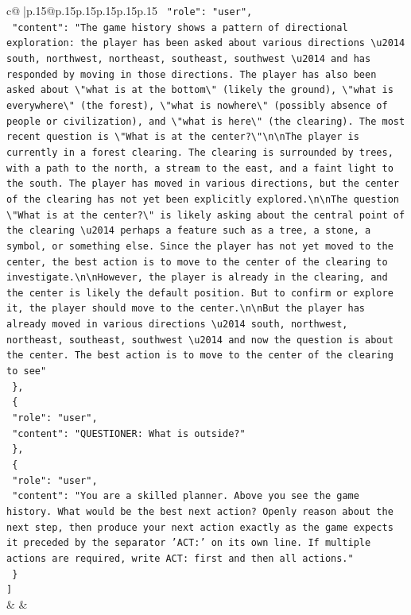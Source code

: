 \documentclass{article}
\begin{document}
{\begin{supertabular}{c@{$\;$}|p{.15\linewidth}@{}p{.15\linewidth}p{.15\linewidth}p{.15\linewidth}p{.15\linewidth}p{.15\linewidth}}
{{{\texttt{    "role": "user",} \\
\texttt{    "content": "The game history shows a pattern of directional exploration: the player has been asked about various directions \textbackslash{}u2014 south, northwest, northeast, southeast, southwest \textbackslash{}u2014 and has responded by moving in those directions. The player has also been asked about \textbackslash{}"what is at the bottom\textbackslash{}" (likely the ground), \textbackslash{}"what is everywhere\textbackslash{}" (the forest), \textbackslash{}"what is nowhere\textbackslash{}" (possibly absence of people or civilization), and \textbackslash{}"what is here\textbackslash{}" (the clearing). The most recent question is \textbackslash{}"What is at the center?\textbackslash{}"\textbackslash{}n\textbackslash{}nThe player is currently in a forest clearing. The clearing is surrounded by trees, with a path to the north, a stream to the east, and a faint light to the south. The player has moved in various directions, but the center of the clearing has not yet been explicitly explored.\textbackslash{}n\textbackslash{}nThe question \textbackslash{}"What is at the center?\textbackslash{}" is likely asking about the central point of the clearing \textbackslash{}u2014 perhaps a feature such as a tree, a stone, a symbol, or something else. Since the player has not yet moved to the center, the best action is to move to the center of the clearing to investigate.\textbackslash{}n\textbackslash{}nHowever, the player is already in the clearing, and the center is likely the default position. But to confirm or explore it, the player should move to the center.\textbackslash{}n\textbackslash{}nBut the player has already moved in various directions \textbackslash{}u2014 south, northwest, northeast, southeast, southwest \textbackslash{}u2014 and now the question is about the center. The best action is to move to the center of the clearing to see"} \\
\texttt{  \},} \\
\texttt{  \{} \\
\texttt{    "role": "user",} \\
\texttt{    "content": "QUESTIONER: What is outside?"} \\
\texttt{  \},} \\
\texttt{  \{} \\
\texttt{    "role": "user",} \\
\texttt{    "content": "You are a skilled planner. Above you see the game history. What would be the best next action? Openly reason about the next step, then produce your next action exactly as the game expects it preceded by the separator 'ACT:' on its own line. If multiple actions are required, write ACT: first and then all actions."} \\
\texttt{  \}} \\
\texttt{{]}} \\
            }
        }
    }
    & & \\ \\


\end{supertabular}}
\end{document}
